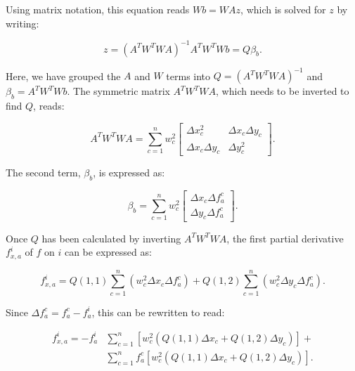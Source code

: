 \documentclass{article}
\begin{document}
Using matrix notation, this equation reads $Wb = WAz$, which is solved for $z$ by writing:

\begin{equation} \label{eq:disc_LSmatrixz}
z = {\left( A^T W^T W A \right)}^{-1} A^T W^T W b = Q \beta_b.
\end{equation}

Here, we have grouped the $A$ and $W$ terms into $Q = {\left( A^T W^T W A \right)}^{-1}$ and $\beta_b = A^T W^T W b$. The symmetric matrix $A^T W^T W A$, which needs to be inverted to find $Q$, reads:

\begin{equation} \label{eq:disc_LSATWTWA}
A^T W^T W A = \sum_{c=1}^n w_c^2
\begin{bmatrix}
\Delta x_c^2 & \Delta x_c \Delta y_c \\
\Delta x_c \Delta y_c & \Delta y_c^2
\end{bmatrix}.
\end{equation}

The second term, $\beta_b$, is expressed as:

\begin{equation} \label{eq:disc_LSbetab}
\beta_b = \sum_{c=1}^n w_c^2
\begin{bmatrix}
\Delta x_c \Delta f_a^c \\ \Delta y_c \Delta f_a^c
\end{bmatrix}.
\end{equation}

Once $Q$ has been calculated by inverting $A^T W^T W A$, the first partial derivative $f_{x,a}^i$ of $f$ on $i$ can be expressed as:

\begin{equation} \label{eq:disc_LSfxifyi}
f_{x,a}^i = 
Q(1,1) \sum_{c=1}^n \left( w_c^2 \Delta x_c \Delta f_a^c \right) + 
Q(1,2) \sum_{c=1}^n \left( w_c^2 \Delta y_c \Delta f_a^c \right).
\end{equation}

Since $\Delta f_a^c = f_a^c - f_a^i$, this can be rewritten to read:

\begin{equation}
\begin{split}
f_{x,a}^i = -f_a^i & \sum_{c=1}^n \left[ w_c^2 \left( Q(1,1) \Delta x_c + Q(1,2) \Delta y_c \right) \right] + \\
& \sum_{c=1}^n f_a^c \left[ w_c^2 \left( Q(1,1) \Delta x_c + Q(1,2) \Delta y_c \right) \right].
\end{split}
\end{equation}
\end{document}
